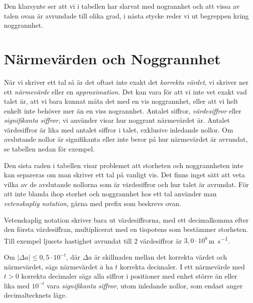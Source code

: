 \bigskip

Den klarsynte ser att vi i tabellen har slarvat med nogrannhet och att
vissa av talen ovan är avrundade till olika grad, i nästa stycke reder
vi ut begreppen kring noggrannhet.

\section{Närmevärden och Noggrannhet}

När vi skriver ett tal så är det oftast inte exakt det \emph{korrekta
värdet}, vi skriver ner ett \emph{närmevärde} eller en
\emph{approximation}.  Det kan vara för att vi inte vet exakt vad
talet är, att vi bara kunnat mäta det med en vis noggrannhet, eller
att vi helt enkelt inte behöver mer än en viss nogrannhet. Antalet
siffror, \emph{värdesiffror} eller \emph{signifikanta siffror}, vi
använder visar hur noggrant närmevärdet är.  Antalet värdesiffror är
lika med antalet siffror i talet, exklusive inledande nollor.  Om
avslutande nollor är signifikanta eller inte beror på hur närmevärdet
är avrundat, se tabellen nedan för exempel.


Den sista raden i tabellen visar problemet att storheten och
noggrannheten inte kan separeras om man skriver ett tal på vanligt
vis. Det finns inget sätt att veta vilka av de avslutande nollorna som
är värdesiffror och hur talet är avrundat.  För att inte blanda ihop
storhet och noggrannhet hos ett tal använder man \emph{vetenskaplig
notation}, gärna med prefix som beskrevs ovan.

Vetenskaplig notation skriver bara ut värdesiffrorna, med ett
decimalkomma efter den första värdesiffran, multiplicerat med en
tiopotens som bestämmer storheten. Till exempel ljusets hastighet
avrundat till 2 värdesiffror är $3,0 \cdot 10^8$\,\unit{\metre\per\second}.

Om $|\Delta a|\leq 0,5\cdot 10^{-t}$, där $\Delta a$ är skillnaden
mellan det korrekta värdet och närmevärdet, sägs närmevärdet $\bar
{a}$ ha $t$ korrekta decimaler.
I ett närmevärde med $t>0$ korrekta decimaler sägs alla siffror i
positioner med enhet större än eller lika med $10^{-t}$ vara
\emph{signifikanta siffror}, utom inledande nollor, som endast anger
decimaltecknets läge.

